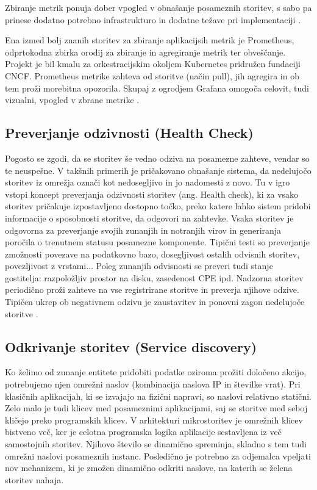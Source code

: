 \documentclass[a4paper, 12pt]{book}
\begin{document}
Zbiranje metrik ponuja dober vpogled v obnašanje posameznih storitev, s sabo pa prinese dodatno potrebno infrastrukturo in dodatne težave pri implementaciji \cite{ApplicationMetrics}.


Ena izmed bolj znanih storitev za zbiranje aplikacijsih metrik je Prometheus, odprtokodna zbirka orodij za zbiranje in agregiranje metrik ter obveščanje.
Projekt je bil kmalu za orkestracijskim okoljem Kubernetes pridružen fundaciji CNCF.
Prometheus metrike zahteva od storitve (način pull), jih agregira in ob tem proži morebitna opozorila.
Skupaj z ogrodjem Grafana omogoča celovit, tudi vizualni, vpogled v zbrane metrike \cite{Prometheus}.

\subsection{Preverjanje odzivnosti (Health Check)}

Pogosto se zgodi, da se storitev še vedno odziva na posamezne zahteve, vendar so te neuspešne.
V takšnih primerih je pričakovano obnašanje sistema, da nedelujočo storitev iz omrežja označi kot nedosegljivo in jo nadomesti z novo.
Tu v igro vstopi koncept preverjanja odzivnosti storitev (ang. Health check), ki za vsako storitev pričakuje izpostavljeno dostopno točko, preko katere lahko sistem pridobi informacije o sposobnosti storitve, da odgovori na zahtevke.
Vsaka storitev je odgovorna za preverjanje svojih zunanjih in notranjih virov in generiranja poročila o trenutnem statusu posamezne komponente.
Tipični testi so preverjanje zmožnosti povezave na podatkovno bazo, dosegljivost ostalih odvisnih storitev, povezljivost z vrstami...
Poleg zunanjih odvisnosti se preveri tudi stanje gostitelja: razpoložljiv prostor na disku, zasedenost CPE ipd.
Nadzorna storitev periodično proži zahteve na vse registrirane storitve in preverja njihove odzive.
Tipičen ukrep ob negativnem odzivu je zaustavitev in ponovni zagon nedelujoče storitve \cite{healthCheck}.

\subsection{Odkrivanje storitev (Service discovery)}

Ko želimo od zunanje entitete pridobiti podatke oziroma prožiti določeno akcijo, potrebujemo njen omrežni naslov (kombinacija naslova IP in številke vrat).
Pri klasičnih aplikacijah, ki se izvajajo na fizični napravi, so naslovi relativno statični.
Zelo malo je tudi klicev med posameznimi aplikacijami, saj se storitve med seboj kličejo preko programskih klicev.
V arhitekturi mikrostoritev je omrežnih klicev bistveno več, ker je celotna programska logika aplikacije sestavljena iz več samostojnih storitev.
Njihovo število se dinamično spreminja, skladno s tem tudi omrežni naslovi posameznih instanc.
Posledično je potrebno za odjemalca vpeljati nov mehanizem, ki je zmožen dinamično odkriti naslove, na katerih se želena storitev nahaja.
\end{document}
